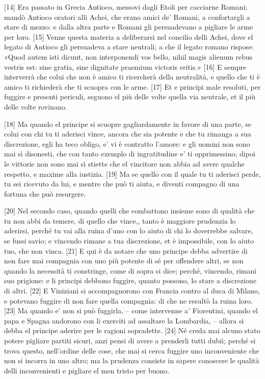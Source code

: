 {[}14{]} Era passato in Grecia Antioco, messovi dagli Etoli per
cacciarne Romani; mandò Antioco oratori alli Achei, che erano amici de'
Romani, a confortargli a stare di mezzo: e dalla altra parte e Romani
gli persuadevano a pigliare le arme per loro. {[}15{]} Venne questa
materia a deliberarsi nel concilio delli Achei, dove el legato di
Antioco gli persuadeva a stare neutrali; a che il legato romano rispose:
«Quod autem isti dicunt, non interponendi vos bello, nihil magis alienum
rebus vestris est: sine gratia, sine dignitate praemium victoris
eritis.» {[}16{]} E sempre interverrà che colui che non è amico ti
ricercherà della neutralità, e quello che ti è amico ti richiederà che
ti scuopra con le arme. {[}17{]} Et e principi male resoluti, per
fuggire e presenti periculi, seguono el più delle volte quella via
neutrale, et il più delle volte rovinano.

{[}18{]} Ma quando el principe si scuopre gagliardamente in favore di
una parte, se colui con chi tu ti aderisci vince, ancora che sia potente
e che tu rimanga a sua discrezione, egli ha teco obligo, e' vi è
contratto l'amore: e gli uomini non sono mai sì disonesti, che con tanto
exemplo di ingratitudine e' ti opprimessino; dipoi le vittorie non sono
mai sì stiette che el vincitore non abbia ad avere qualche respetto, e
maxime alla iustizia. {[}19{]} Ma se quello con il quale tu ti aderisci
perde, tu sei ricevuto da lui, e mentre che può ti aiuta, e diventi
compagno di una fortuna che può resurgere.

\quebra

{[}20{]} Nel secondo caso, quando quelli che combattono insieme sono di
qualità che tu non abbi da temere, di quello che vince,, tanto è
maggiore prudenzia lo aderirsi, perché tu vai alla ruina d'uno con lo
aiuto di chi lo doverrebbe salvare, se fussi savio; e vincendo rimane a
tua discrezione, et è impossibile, con lo aiuto tuo, che non vinca.
{[}21{]} E qui è da notare che uno principe debba advertire di non fare
mai compagnia con uno più potente di sé per offendere altri, se non
quando la necessità ti constringe, come di sopra si dice; perché,
vincendo, rimani suo prigione: e li principi debbono fuggire, quanto
possono, lo stare a discrezione di altri. {[}22{]} E Viniziani si
accompagnorono con Francia contro al duca di Milano, e potevano fuggire
di non fare quella compagnia: di che ne resultò la ruina loro. {[}23{]}
Ma quando e' non si può fuggirla, -- come intervenne a' Fiorentini,
quando el papa e Spagna andorono con li exerciti ad assaltare la
Lombardia, -- allora si debba el principe aderire per le ragioni sopradette. {[}24{]} Né creda mai alcuno stato potere pigliare partiti sicuri, anzi pensi di avere a prenderli tutti dubii; perché si trova questo, nell'ordine delle cose, che mai si cerca fuggire uno inconveniente che non si incorra in uno altro; ma la prudenza consiste in sapere conoscere le qualità delli inconvenienti e pigliare el men tristo per buono.

